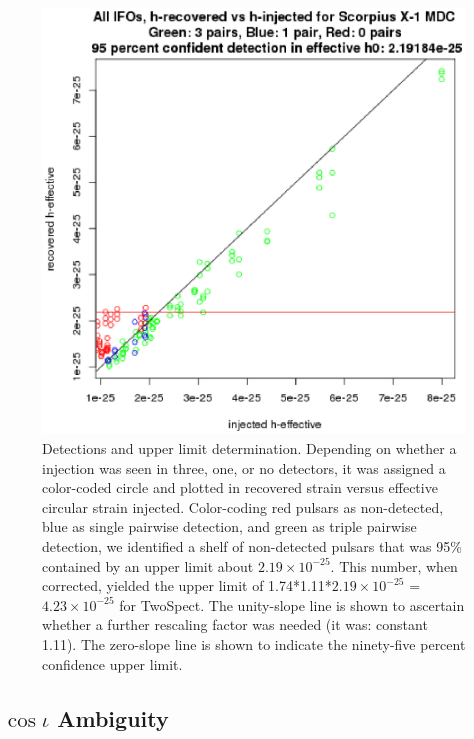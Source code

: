 \begin{figure}
\begin{center}
\includegraphics[width=0.3\paperwidth,height=0.2\paperheight]{HrecoveredVsHeffectiveFullUL.eps}
\caption{Detections and upper limit determination.
Depending on whether a injection was seen in three, one, or no detectors, it was assigned a color-coded circle and plotted in recovered strain versus effective circular strain injected.
Color-coding red pulsars as non-detected, blue as single pairwise detection, and green as triple pairwise detection, we identified a shelf of non-detected pulsars that was 95\% contained by an upper limit about $2.19 \times 10^{-25}$. This number, when corrected, yielded the upper limit of 1.74*1.11*$2.19 \times 10^{-25}$ = $4.23 \times 10^{-25}$ for TwoSpect. 
The unity-slope line is shown to ascertain whether a further rescaling factor was needed (it was: constant 1.11).
The zero-slope line is shown to indicate the ninety-five percent confidence upper limit.
\label{fig:hrecoveredvsheffectivefullul}}
\end{center}
\end{figure}


\subsection{$\cos \iota$ Ambiguity}

